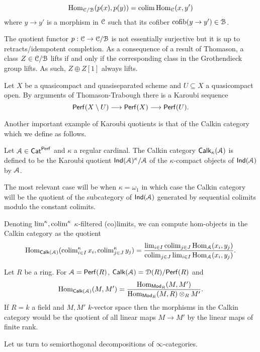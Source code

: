 $$\mathrm{Hom}_{\EuScript{C}/\EuScript{B}}(p(x),p(y))=\operatorname{colim}\mathrm{Hom}_{\EuScript{C}}(x,y')$$
where $y\to y'$ is a morphism in $\EuScript{C}$ such that its cofiber $\mathrm{cofib}(y\to y')\in\EuScript{B}$. 
\begin{remark}
    The quotient functor $p:\EuScript{C}\to\EuScript{C}/\EuScript{B}$ is not essentially surjective but it is up to retracts/idempotent completion. As a consequence of a result of Thomason, a class $Z\in\EuScript{C}/\EuScript{B}$ lifts if and only if the corresponding class in the Grothendieck group lifts. As such, $Z\oplus Z[1]$ always lifts. 
\end{remark}
\begin{example}
    Let $X$ be a quasicompact and quasiseparated scheme and $U\subseteq X$ a quasicompact open. By arguments of Thomason-Trabough there is a Karoubi sequence 
    $$\mathsf{Perf}(X\setminus U)\longrightarrow\mathsf{Perf}(X)\longrightarrow\mathsf{Perf}(U).$$
\end{example}
Another important example of Karoubi quotients is that of the Calkin category which we define as follows. 
\begin{definition}\label{def: Calkin category}
    Let $\EuScript{A}\in\mathsf{Cat}^{\mathsf{Perf}}$ and $\kappa$ a regular cardinal. The Calkin category $\mathsf{Calk}_{\kappa}(\EuScript{A})$ is defined to be the Karoubi quotient $\mathsf{Ind}(\EuScript{A})^{\kappa}/\EuScript{A}$ of the $\kappa$-compact objects of $\mathsf{Ind}(\EuScript{A})$ by $\EuScript{A}$. 
\end{definition}
\begin{remark}
    The most relevant case will be when $\kappa=\omega_{1}$ in which case the Calkin category will be the quotient of the subcategory of $\mathsf{Ind}(\EuScript{A})$ generated by sequential colimits modulo the constant colimits. 
\end{remark}
Denoting $\lim^{\kappa},\operatorname{colim}^{\kappa}$ $\kappa$-filtered (co)limits, we can compute hom-objects in the Calkin category as the quotient 
$$\mathrm{Hom}_{\mathsf{Calk}(\EuScript{A})}(\operatorname{colim}^{\kappa}_{i\in I}x_{i}, \operatorname{colim}^{\kappa}_{j\in J}y_{j})=\frac{\lim_{i\in I}\operatorname{colim}_{j\in J}\mathrm{Hom}_{\EuScript{A}}(x_{i},y_{j})}{\operatorname{colim}_{j\in J}\lim_{i\in I}\mathrm{Hom}_{\EuScript{A}}(x_{i},y_{j})}.$$
\begin{example}
    Let $R$ be a ring. For $\EuScript{A}=\mathsf{Perf}(R)$, $\mathsf{Calk}(\EuScript{A})=\EuScript{D}(R)/\mathsf{Perf}(R)$ and 
    $$\mathrm{Hom}_{\mathsf{Calk}(\EuScript{A})}(M,M')=\frac{\mathrm{Hom}_{\mathsf{Mod}_{R}}(M,M')}{\mathrm{Hom}_{\mathsf{Mod}_{R}}(M,R)\otimes_{R}M'}.$$
    If $R=k$ a field and $M,M'$ $k$-vector space then the morphisms in the Calkin category would be the quotient of all linear maps $M\to M'$ by the linear maps of finite rank. 
\end{example}
Let us turn to semiorthogonal decompositions of $\infty$-categories. 
